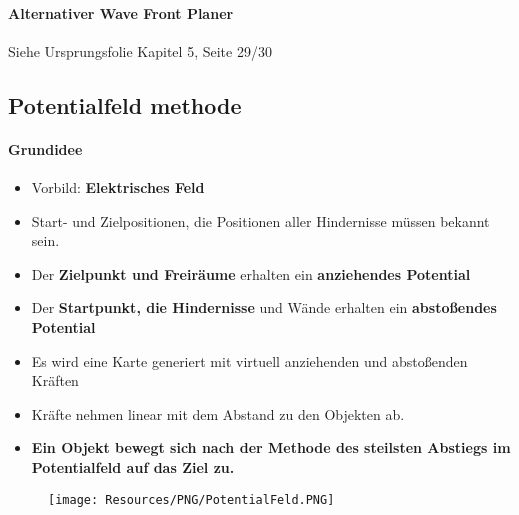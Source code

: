 \paragraph{Alternativer Wave Front Planer}
Siehe Ursprungsfolie Kapitel 5, Seite 29/30
\subsection{Potentialfeld methode}
\paragraph{Grundidee}
\begin{itemize}
	\item Vorbild: \textbf{Elektrisches Feld}
	\item Start- und Zielpositionen, die Positionen aller Hindernisse müssen bekannt sein.
	\item Der \textbf{Zielpunkt und Freiräume} erhalten ein \textbf{anziehendes Potential}
	\item Der \textbf{Startpunkt, die Hindernisse} und Wände erhalten ein \textbf{abstoßendes Potential}
	\item Es wird eine Karte generiert mit virtuell anziehenden und abstoßenden Kräften
	\item Kräfte nehmen linear mit dem Abstand zu den Objekten ab.
	\item \textbf{Ein Objekt bewegt sich nach der Methode des steilsten Abstiegs im Potentialfeld auf das Ziel zu.}
\end{itemize}
\begin{figure}[H]
	\begin{center}
		\texttt{[image: Resources/PNG/PotentialFeld.PNG]}
		\caption{}
		\label{fig:PNG/PotentialFeld.PNG}
	\end{center}
\end{figure}
